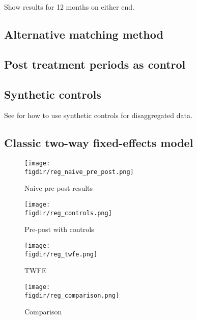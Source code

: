 Show results for 12 months on either end.

\subsection{Alternative matching method}%
\label{sub:alternative_matching_method}

\subsection{Post treatment periods as control}%
\label{sub:post_treatment_periods_as_control}

\subsection{Synthetic controls}%
\label{sub:synthetic_controls}

See \citet{abadie2021penalized} for how to use synthetic controls for disaggregated data.

\subsection{Classic two-way fixed-effects model}%
\label{sub:classic_two_way_fixed_effects_model}


\begin{figure}[htpb]
    \centering
    \caption{Naive pre-post results}%
    \texttt{[image: \\figdir/reg\_naive\_pre\_post.png]}
    \label{fig:reg_naive_pre_post}
\end{figure}

\begin{figure}[htpb]
    \centering
    \caption{Pre-post with controls}%
    \texttt{[image: \\figdir/reg\_controls.png]}
    \label{fig:reg_controls}
\end{figure}

\begin{figure}[htpb]
    \centering
    \caption{TWFE}%
    \texttt{[image: \\figdir/reg\_twfe.png]}
    \label{fig:reg_twfe}
\end{figure}

\begin{figure}[htpb]
    \centering
    \caption{Comparison}%
    \texttt{[image: \\figdir/reg\_comparison.png]}
    \label{fig:reg_comparison}
\end{figure}
